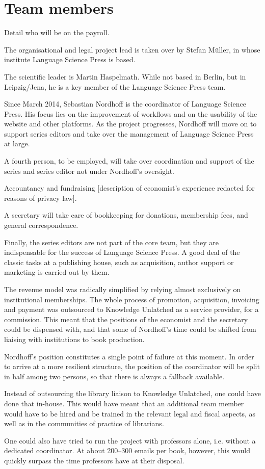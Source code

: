 \documentclass[nonflat,smallfont
]{langsci/langscibook}
\newcommand{\background}[1]{ 
  \vspace{5mm}
  \renewcommand{\tblslinecolour}{lsDarkBlue}
  \tblssy[red]{explore2}{Background}{\vspace*{-5mm}#1}
}
\newcommand{\langscisolution}[1]{
  \renewcommand{\tblslinecolour}{lsLightBlue}
  \tblssy{langsci}{LangSci solution}{\vspace*{-5mm}#1}
}
\newcommand{\evaluation}[1]{
  \renewcommand{\tblslinecolour}{lsLightOrange}
  \tblssy{receipt}{Evaluation}{\vspace*{-5mm}#1}
}
\newcommand{\othersolutions}[1]{
  \renewcommand{\tblslinecolour}{lsDarkGreenOne}
  \tblssy{more}{Other solutions}{\vspace*{-5mm}#1}
}
\renewcommand{\tblssy}[4][black!12]{%
  \renewcommand{\langscisymbol}{#2}\renewcommand{\tblsboxcolor}{#1}
  \begin{mdframed}[style=yellowexercise,frametitle={#3}]
    #4
  \end{mdframed}
}
\begin{document}
\section{Team members}
\vspace*{5mm}
\background{Detail who will be on the payroll. }
\langscisolution{
The organisational and legal project lead is taken over by Stefan Müller, in whose institute Language Science Press is based.

The scientific leader is Martin Haspelmath. While not based in Berlin, but in Leipzig\slash Jena, he is a key member of the Language Science Press team.

Since March 2014, Sebastian Nordhoff is the coordinator of Language Science Press. His focus lies on the improvement of workflows and on the usability of the website and other platforms. As the project progresses, Nordhoff will move on to support series editors and take over the management of Language Science Press at large.

A fourth person, to be employed, will take over coordination and support of the series and series editor not under Nordhoff's oversight. 

Accountancy and fundraising
[description of economist's experience redacted for reasons of  privacy law].

A secretary will take care of bookkeeping for donations, membership fees, and general correspondence.

Finally, the series editors are not part of the core team, but they are indispensable for the success of Language Science Press. A good deal of the classic tasks at a publishing house, such as acquisition, author support or marketing is carried out by them. 

}
\evaluation{The revenue model was radically simplified by relying almost exclusively on institutional memberships. The whole process of promotion, acquisition, invoicing and payment was outsourced to Knowledge Unlatched as a service provider, for a commission. This meant that the positions of the economist and the secretary could be dispensed with, and that some of Nordhoff's time could be shifted from liaising with institutions to book production. 

Nordhoff's position constitutes a single point of failure at this moment. In order to arrive at a more resilient structure, the position of the coordinator will be split in half among two persons, so that there is always a fallback available.
}
\othersolutions{
Instead of outsourcing the library liaison to Knowledge Unlatched, one could have done that in-house. This would have meant that an additional team member would have to be hired and be trained in the relevant legal and fiscal aspects, as well as in the communities of practice of librarians. 

One could also have tried to run the project with professors alone, i.e. without a dedicated coordinator. At about 200--300 emails per book, however, this would quickly surpass the time professors have at their disposal. 
}
 
\end{document}
